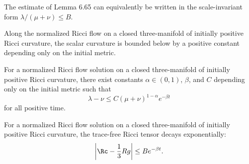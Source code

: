 \begin{remark}
\label{ch06-rem-scale-invariant-pinching}
The estimate of Lemma 6.65 can equivalently be written in the scale-invariant form \(\lambda/(\mu+\nu)\le B\).
\end{remark}

\begin{lemma}
\label{ch06-lem-uniform-positive-scalar-lower-bound}
Along the normalized Ricci flow on a closed three-manifold of initially positive Ricci curvature, the scalar curvature is bounded below by a positive constant depending only on the initial metric.
\end{lemma}

\begin{proposition}
\label{ch06-prop-exponential-pinching-sectional-curvature}
For a normalized Ricci flow solution on a closed three-manifold of initially positive Ricci curvature, there exist constants \(\alpha\in(0,1)\), \(\beta\), and \(C\) depending only on the initial metric such that
\[
\lambda-\nu\le C(\mu+\nu)^{1-\alpha}e^{-\beta t}
\]
for all positive time.
\end{proposition}

\begin{corollary}
\label{ch06-cor-exponential-decay-tracefree-ricci}
For a normalized Ricci flow solution on a closed three-manifold of initially positive Ricci curvature, the trace-free Ricci tensor decays exponentially:
\[
\left|\Rc-\frac13 Rg\right| \le Be^{-\beta t}.
\]
\end{corollary}
